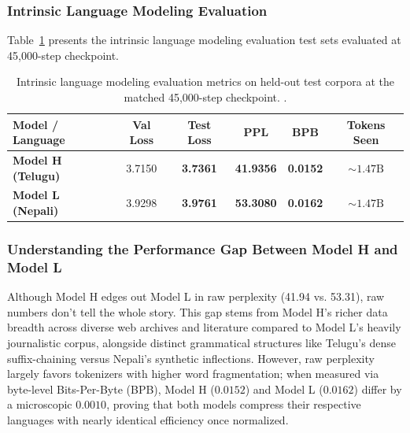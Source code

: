 \documentclass[8pt]{article}
\begin{document}
\subsubsection{Intrinsic Language Modeling Evaluation}
Table~\ref{tab:lm_eval} presents the intrinsic language modeling evaluation test sets evaluated at 45,000-step checkpoint.

\begin{table}[!htp]
    \centering
    \footnotesize %
    \setlength{\tabcolsep}{3.5pt} %
    \begin{tabular}{lccccc}
        \toprule
        \textbf{Model / Language} & \textbf{Val Loss} & \textbf{Test Loss} & \textbf{PPL} & \textbf{BPB} & \textbf{Tokens Seen} \\
        \midrule
        \textbf{Model H (Telugu)} & 3.7150 & \textbf{3.7361} & \textbf{41.9356} & \textbf{0.0152} & $\sim 1.47\text{B}$ \\
        \textbf{Model L (Nepali)} & 3.9298 & \textbf{3.9761} & \textbf{53.3080} & \textbf{0.0162} & $\sim 1.47\text{B}$ \\
        \bottomrule
    \end{tabular}
    \caption{Intrinsic language modeling evaluation metrics on held-out test corpora at the matched 45,000-step checkpoint. .}
    \label{tab:lm_eval}
\end{table}

\subsubsection{Understanding the Performance Gap Between Model H and Model L}
Although Model H edges out Model L in raw perplexity (41.94 vs. 53.31), raw numbers don't tell the whole story. This gap stems from Model H's richer data breadth across diverse web archives and literature compared to Model L's heavily journalistic corpus, alongside distinct grammatical structures like Telugu's dense suffix-chaining versus Nepali's synthetic inflections. However, raw perplexity largely favors tokenizers with higher word fragmentation; when measured via byte-level Bits-Per-Byte (BPB), Model H ($0.0152$) and Model L ($0.0162$) differ by a microscopic $0.0010$, proving that both models compress their respective languages with nearly identical efficiency once normalized.
\end{document}
